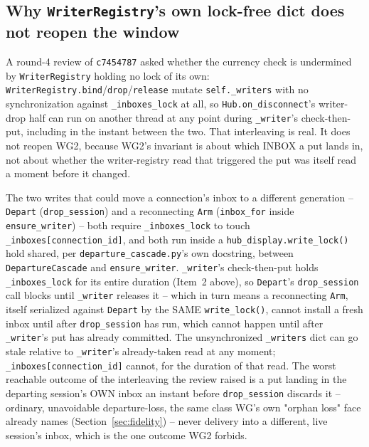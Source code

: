\documentclass[a4paper,10pt,fleqn]{article}
\begin{document}
\subsection{Why \texttt{WriterRegistry}'s own lock-free dict does not reopen the window}

A round-4 review of \texttt{c7454787} asked whether the currency check is
undermined by \texttt{WriterRegistry} holding no lock of its own:
\texttt{WriterRegistry.bind}/\texttt{drop}/\texttt{release} mutate
\texttt{self.\_writers} with no synchronization against \texttt{\_inboxes\_lock}
at all, so \texttt{Hub.on\_disconnect}'s writer-drop half can run on another
thread at any point during \texttt{\_writer}'s check-then-put, including in
the instant between the two. That interleaving is real. It does not
reopen WG2, because WG2's invariant is about which INBOX a put lands in, not
about whether the writer-registry read that triggered the put was itself
read a moment before it changed.

The two writes that could move a connection's inbox to a different
generation -- \texttt{Depart} (\texttt{drop\_session}) and a reconnecting
\texttt{Arm} (\texttt{inbox\_for} inside \texttt{ensure\_writer}) -- both
require \texttt{\_inboxes\_lock} to touch \texttt{\_inboxes[connection\_id]},
and both run inside a \texttt{hub\_display.write\_lock()} hold shared, per
\texttt{departure\_cascade.py}'s own docstring, between
\texttt{DepartureCascade} and \texttt{ensure\_writer}. \texttt{\_writer}'s
check-then-put holds \texttt{\_inboxes\_lock} for its entire duration
(Item~2 above), so \texttt{Depart}'s \texttt{drop\_session} call blocks until
\texttt{\_writer} releases it -- which in turn means a reconnecting
\texttt{Arm}, itself serialized against \texttt{Depart} by the SAME
\texttt{write\_lock()}, cannot install a fresh inbox until after
\texttt{drop\_session} has run, which cannot happen until after
\texttt{\_writer}'s put has already committed. The unsynchronized
\texttt{\_writers} dict can go stale relative to \texttt{\_writer}'s already-taken
read at any moment; \texttt{\_inboxes[connection\_id]} cannot, for the
duration of that read. The worst reachable outcome of the interleaving the
review raised is a put landing in the departing session's OWN inbox an
instant before \texttt{drop\_session} discards it -- ordinary,
unavoidable departure-loss, the same class WG's own "orphan loss" face
already names (Section~\ref{sec:fidelity}) -- never delivery into a
different, live session's inbox, which is the one outcome WG2 forbids.
\end{document}
